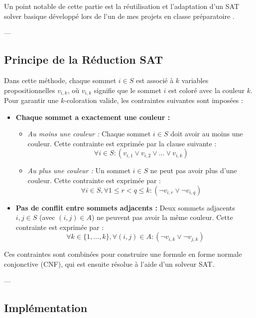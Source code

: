 \documentclass[11pt]{article}
\begin{document}
Un point notable de cette partie est la réutilisation et l'adaptation d'un SAT solver basique développé lors de l'un de mes projets en classe préparatoire \cite{duff_sat_solver}.

---

\subsection{Principe de la Réduction SAT}

Dans cette méthode, chaque sommet \(i \in S\) est associé à \(k\) variables propositionnelles \(v_{i,k}\), où \(v_{i,k}\) signifie que le sommet \(i\) est coloré avec la couleur \(k\). Pour garantir une \(k\)-coloration valide, les contraintes suivantes sont imposées :

\begin{itemize}
    \item \textbf{Chaque sommet a exactement une couleur :}
        \begin{itemize}
            \item \textit{Au moins une couleur :} Chaque sommet \(i \in S\) doit avoir au moins une couleur. Cette contrainte est exprimée par la clause suivante :
            \[
            \forall i \in S : (v_{i,1} \lor v_{i,2} \lor \ldots \lor v_{i,k})
            \]
            \item \textit{Au plus une couleur :} Un sommet \(i \in S\) ne peut pas avoir plus d'une couleur. Cette contrainte est exprimée par :
            \[
            \forall i \in S, \forall 1 \leq r < q \leq k : (\neg v_{i,r} \lor \neg v_{i,q})
            \]
        \end{itemize}
    \item \textbf{Pas de conflit entre sommets adjacents :} Deux sommets adjacents \(i, j \in S\) (avec \((i, j) \in A\)) ne peuvent pas avoir la même couleur. Cette contrainte est exprimée par :
    \[
    \forall k \in \{1, \ldots, k\}, \forall (i, j) \in A : (\neg v_{i,k} \lor \neg v_{j,k})
    \]
\end{itemize}

Ces contraintes sont combinées pour construire une formule en forme normale conjonctive (CNF), qui est ensuite résolue à l'aide d'un solveur SAT.

---

\subsection{Implémentation}
\end{document}
